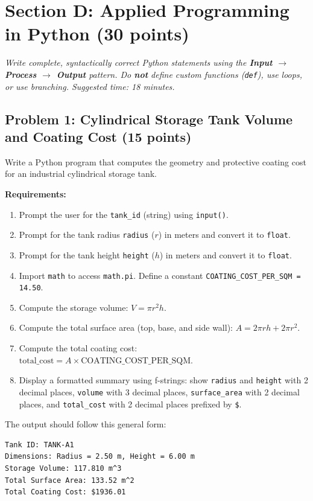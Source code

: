 \documentclass[11pt,a4paper]{article}
\begin{document}
\section*{Section D: Applied Programming in Python \hfill \normalsize\normalfont(30 points)}
\textit{Write complete, syntactically correct Python statements using the \textbf{Input $\rightarrow$ Process $\rightarrow$ Output} pattern. Do \textbf{not} define custom functions (\texttt{def}), use loops, or use branching. Suggested time: 18 minutes.}

\subsection*{Problem 1: Cylindrical Storage Tank Volume and Coating Cost (15 points)}
Write a Python program that computes the geometry and protective coating cost for an industrial cylindrical storage tank.

\textbf{Requirements:}
\begin{enumerate}[leftmargin=2em,label=\arabic*.,itemsep=2pt]
  \item Prompt the user for the \texttt{tank\_id} (string) using \texttt{input()}.
  \item Prompt for the tank radius \texttt{radius} ($r$) in meters and convert it to \texttt{float}.
  \item Prompt for the tank height \texttt{height} ($h$) in meters and convert it to \texttt{float}.
  \item Import \texttt{math} to access \texttt{math.pi}. Define a constant \texttt{COATING\_COST\_PER\_SQM = 14.50}.
  \item Compute the storage volume: $V = \pi r^2 h$.
  \item Compute the total surface area (top, base, and side wall): $A = 2 \pi r h + 2 \pi r^2$.
  \item Compute the total coating cost: $\text{total\_cost} = A \times \text{COATING\_COST\_PER\_SQM}$.
  \item Display a formatted summary using f-strings: show \texttt{radius} and \texttt{height} with 2 decimal places, \texttt{volume} with 3 decimal places, \texttt{surface\_area} with 2 decimal places, and \texttt{total\_cost} with 2 decimal places prefixed by \texttt{\$}.
\end{enumerate}

The output should follow this general form:
\begin{lstlisting}
Tank ID: TANK-A1
Dimensions: Radius = 2.50 m, Height = 6.00 m
Storage Volume: 117.810 m^3
Total Surface Area: 133.52 m^2
Total Coating Cost: $1936.01
\end{lstlisting}
\end{document}
